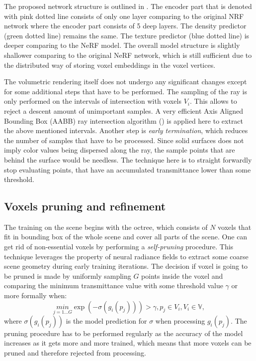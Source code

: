 The proposed network structure is outlined in .
The encoder part that is denoted with pink dotted line
consists of only one layer comparing to the original NRF network
where the encoder part consists of 5 deep layers.
The density predictor (green dotted line) remains the same.
The texture predictor (blue dotted line) is deeper comparing to the NeRF model.
The overall model structure is slightly shallower comparing to the original NeRF network,
which is still sufficient due to the distributed way of storing voxel embeddings in the voxel vertices.

The volumetric rendering itself does not undergo any significant changes
except for some additional steps that have to be performed.
The sampling of the ray is only performed on the intervals of intersection with voxels $V_i$.
This allows to reject a descent amount of unimportant samples.
A very efficient Axis Aligned Bounding Box (AABB) ray intersection algorithm (\cite{haines1989essential}) is applied here
to extract the above mentioned intervals.
Another step is \textit{early termination}, which reduces the number of samples that have to be processed.
Since solid surfaces does not imply color values being dispersed along the ray,
the sample points that are behind the surface would be needless.
The technique here is to straight forwardly stop evaluating points,
that have an accumulated transmittance lower than some threshold.

\subsection{Voxels pruning and refinement}
\label{subsec:pruning}

The training on the scene begins with the octree,
which consists of $N$ voxels that fit in bounding box of the whole scene
and cover all parts of the scene.
One can get rid of non-essential voxels by performing a \textit{self-pruning} procedure.
This technique leverages the property of neural radiance fields
to extract some coarse scene geometry during early training iterations.
The decision if voxel is going to be pruned is made by uniformly sampling $G$ points inside the voxel
and comparing the minimum transmittance value with some threshold value $\gamma$ or more formally when:
\begin{equation}
    \underset{j=1 \dots G}{min} {\exp (- \sigma (g_i(p_j)))} > \gamma, p_j \in V_i, V_i \in \mathbb{V},
\end{equation}
where $\sigma (g_i(p_j))$ is the model prediction for $\sigma$ when processing $g_i(p_j)$.
The pruning procedure has to be performed regularly as the accuracy of the model increases as it gets more and more trained,
which means that more voxels can be pruned and therefore rejected from processing.

